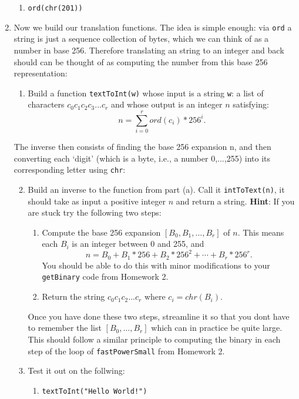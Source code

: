 \documentclass[11pt]{article}
\begin{document}
\begin{enumerate}
{\begin{enumerate}
{\begin{enumerate}
      \item{\verb|ord(chr(201))|}
    \end{enumerate}
    }
  \end{enumerate}
}
\item{
Now we build our translation functions.  The idea is simple enough: via \verb|ord| a string is just a sequence collection of bytes, which we can think of as a number in base 256.  Therefore translating an string to an integer and back should can be thought of as computing the number from this base 256 representation:
\begin{enumerate}
  \item{
    Build a function \verb|textToInt(w)| whose input is a string \verb|w|: a list of characters $c_0c_1c_2c_3...c_r$ and whose output is an integer $n$ satisfying:
    \[n = \sum_{i=0}^r ord(c_i)*256^i.\]
  }
\end{enumerate}
The inverse then consists of finding the base 256 expansion n, and then converting each `digit' (which is a byte, i.e., a number 0,...,255) into its corresponding letter using \verb|chr|:
\begin{enumerate}
  \setcounter{enumii}{1}
  \item{
    Build an inverse to the function from part (a).  Call it \verb|intToText(n)|, it should take as input a positive integer $n$ and return a string.  \textbf{Hint}: If you are stuck try the following two steps:
    \begin{enumerate}[(1)]
      \item{
      Compute the base 256 expansion $[B_0,B_1,...,B_r]$ of $n$.  This means each $B_i$ is an integer between 0 and 255, and
      \[n = B_0 + B_1*256 + B_2*256^2 + \cdots + B_r*256^r.\]
      You should be able to do this with minor modifications to your \verb|getBinary| code from Homework 2.
      }
      \item{
      Return the string $c_0c_1c_2...c_r$ where $c_i = chr(B_i)$.
      }
    \end{enumerate}
    Once you have done these two steps, streamline it so that you dont have to remember the list $[B_0,...,B_r]$ which can in practice be quite large.  This should follow a similar principle to computing the binary in each step of the loop of \verb|fastPowerSmall| from Homework 2.
    }
    \item{
    Test it out on the follwing:
    \begin{enumerate}
      \item{\verb|textToInt("Hello World!")|}

\end{enumerate}}
\end{enumerate}}
\end{enumerate}
\end{document}
